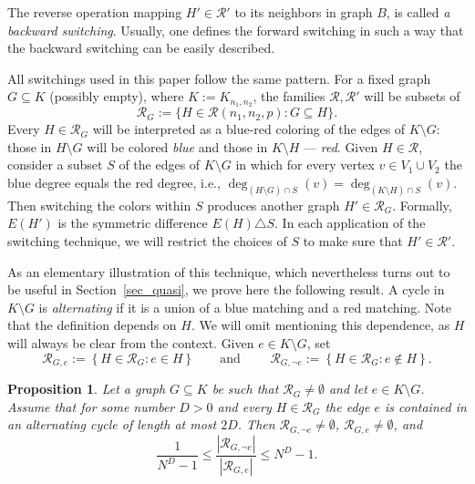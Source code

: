 \documentclass[12pt,reqno]{amsart}
\newcommand{\rc}{{\mathcal{R}}}
\newcommand{\Knn} {K_{n_1,n_2}}
\newtheorem{proposition}[theorem]{Proposition}
\theoremstyle{definition}
\begin{document}
The reverse operation mapping $H' \in \rc'$ to its neighbors in graph $B$, is called \emph{a backward switching}. Usually, one defines the forward switching in such a way that the backward switching can be easily described.


All switchings used in this paper follow the same pattern. For a fixed  graph $G \subseteq K$ (possibly empty), where $K := \Knn$, the families $\rc, \rc'$ will be subsets of
\begin{equation}
  \label{eq_rcG}
  \rc_G := \{ H \in \rc(n_1,n_2,p) : G \subseteq H \}.
\end{equation}
Every  $H \in \rc_G$ will be interpreted as a blue-red coloring of the edges of $K\setminus G$: those in $H\setminus G$ will be colored \emph{blue} and those in $K \setminus H$ --- \emph{red}. Given $H\in\rc$, consider a subset $S$ of the edges of $K\setminus G$ in which for every vertex $v \in V_1 \cup V_2$ the blue degree equals the red degree, i.e., $\deg_{(H\setminus G)\cap S}(v)=\deg_{(K\setminus H)\cap S}(v)$. Then switching the colors within $S$ produces another graph $H' \in \rc_G$. Formally, $E(H')$ is the symmetric difference $E(H) \triangle S$.
In each application of the switching technique, we will restrict the choices of $S$ to make sure that $H' \in \rc'$.

As an elementary illustration of this technique, which nevertheless turns out to be useful in Section~\ref{sec_quasi}, we prove here the following result. A cycle in $K\setminus G$ is \emph{alternating} if it is a union of a blue matching and a red matching. Note that the definition depends on $H$. We will omit mentioning this dependence, as $H$ will always be clear from the context.
 Given $e \in K\setminus G$, set
\begin{equation}
  \label{eq_rcGe}
	\rc_{G,e} := \left\{ H \in \rc_G : e \in H \right\}\qquad\text{and }\qquad \rc_{G,\neg e} := \left\{ H \in \rc_G : e \not\in H \right\}.
\end{equation}

\begin{proposition}
  \label{prop_switch}
  Let a graph $G\subseteq K$ be such that $\rc_G\neq\emptyset$ and let $e\in K\setminus G$. Assume that for some number $D > 0$ and every $H\in \rc_{G}$ the edge $e$ is contained in an alternating cycle of length at most $2D$. Then $\rc_{G,\neg e}\neq\emptyset$, $\rc_{G, e}\neq\emptyset$, and
	\[
		\frac{1}{N^D - 1} \le \frac{|\rc_{G,\neg e}|}{|\rc_{G,e}|} \le N^D - 1.
	\]
\end{proposition}
\end{document}
